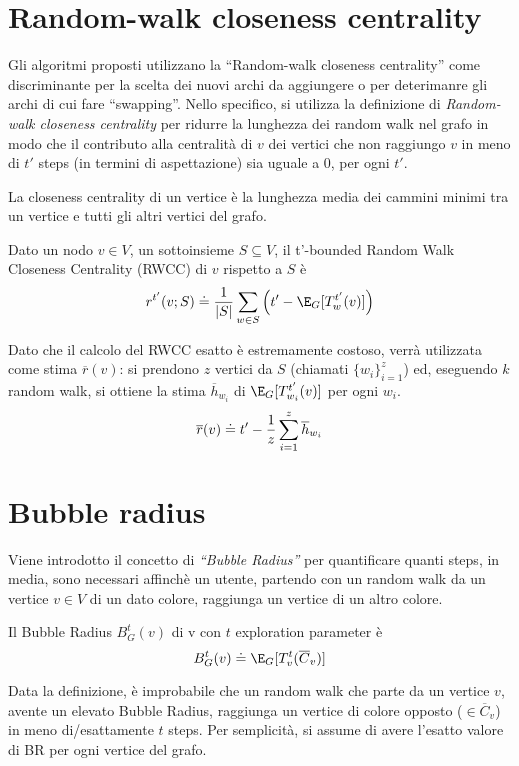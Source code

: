     \section{Random-walk closeness centrality}
        Gli algoritmi proposti utilizzano la ``Random-walk closeness centrality'' come discriminante per la scelta dei nuovi archi da aggiungere o per deterimanre gli archi di cui fare ``swapping''.
        Nello specifico, si utilizza la definizione di \emph{Random-walk closeness centrality} per ridurre la lunghezza
        dei random walk nel grafo in modo che il contributo alla centralità di $v$ dei vertici che non raggiungo $v$ in meno di $t'$ steps (in termini di aspettazione) sia uguale a 0, per ogni $t'$.
        \begin{definition}
            La closeness centrality di un vertice è la lunghezza media dei cammini minimi tra un vertice e tutti gli altri vertici del grafo. 
        \end{definition}
        \begin{definition}
            Dato un nodo $v \in V$, un sottoinsieme $S \subseteq V$, il t'-bounded Random Walk Closeness Centrality (RWCC) di $v$ rispetto a $S$ è
            \begin{equation}
                r^{t'}(v;S)\doteq{1\over{|S|}}\sum_{w\in S}\Big(t'-\E_G[T^{t'}_w(v)]\Big)
            \end{equation}
        \end{definition}
        Dato che il calcolo del RWCC esatto è estremamente costoso, verrà utilizzata come stima $\overline{r}(v)$: si prendono $z$ vertici da $S$ (chiamati ${\{w_i\}}_{i=1}^{z}$) 
        ed, eseguendo $k$ random walk, si ottiene la stima $\overline{h}_{w_i}$ di $\E_G[T^{t'}_{w_i}(v)]$ per ogni $w_i$.
        \begin{equation}
            \overline{r}(v)\doteq t' - {1\over{z}}\sum_{i=1}^{z}\overline{h}_{w_i}
        \end{equation}

    \section{Bubble radius}
        Viene introdotto il concetto di \emph{``Bubble Radius''} per quantificare quanti steps, in media, sono necessari affinchè un utente, partendo con un random walk 
        da un vertice $v\in V$ di un dato colore, raggiunga un vertice di un altro colore.
        \begin{definition}
            Il Bubble Radius $B_{G}^{t}(v)$ di v con $t$ exploration parameter è
             \begin{equation}
                B_{G}^{t}(v)\doteq \E_G[T_{v}^t(\overline{C}_v)]
            \end{equation}
        \end{definition}
        Data la definizione, è improbabile che un random walk che parte da un vertice $v$, avente un elevato Bubble Radius,
        raggiunga un vertice di colore opposto ($\in\overline{C}_v$) in meno di/esattamente $t$ steps. Per semplicità, 
        si assume di avere l'esatto valore di BR per ogni vertice del grafo.
